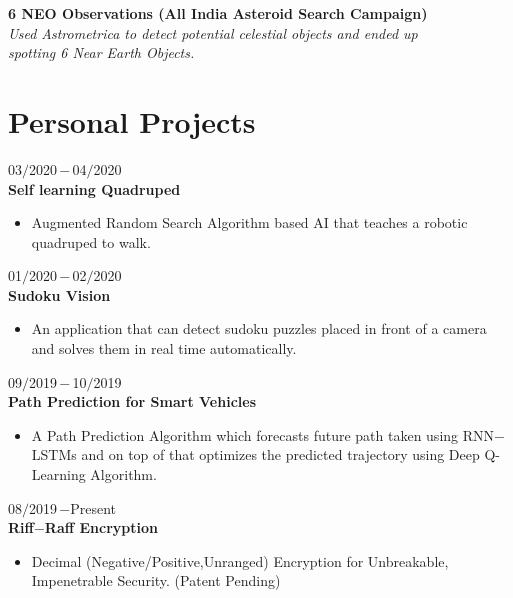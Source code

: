 \documentclass[a4paper, 12pt]{article}
\begin{document}
    \begin{flushleft}
        \textbf{6 NEO Observations (All India Asteroid Search Campaign)}\qquad\qquad\qquad\qquad\qquad{}\\\textit{Used Astrometrica to detect potential celestial objects and ended up\\ spotting 6 Near Earth Objects.}
    \end{flushleft}
    
    
    \section*{Personal Projects}
    \begin{flushleft}
    	03$/$2020\,$-$\,04$/$2020\\
    	\textbf{Self learning Quadruped}
    	\begin{itemize}
    		\item Augmented Random Search Algorithm based AI that teaches a robotic quadruped to walk.
    	\end{itemize}
    \end{flushleft}
    \begin{flushleft}
    	01$/$2020\,$-$\,02$/$2020\\
    	\textbf{Sudoku Vision}
    	\begin{itemize}
    		\item An application that can detect sudoku puzzles placed in front of a camera and solves them in real time automatically.
    	\end{itemize}
    \end{flushleft}
    \begin{flushleft}
    	09$/$2019\,$-$\,10$/$2019\\
    	\textbf{Path Prediction for Smart Vehicles}
    	\begin{itemize}
    		\item A Path Prediction Algorithm which forecasts future path taken using RNN$-$LSTMs and on top
of that optimizes the predicted trajectory using Deep Q-Learning Algorithm.
    	\end{itemize}
    \end{flushleft}
    
    \begin{flushleft}
    	08$/$2019\,$-$Present\\
    	\textbf{Riff$-$Raff Encryption}
    	\begin{itemize}
    		\item Decimal (Negative/Positive,Unranged) Encryption for Unbreakable, Impenetrable Security. (Patent Pending)
    	\end{itemize}
    \end{flushleft}
    
\end{document}
